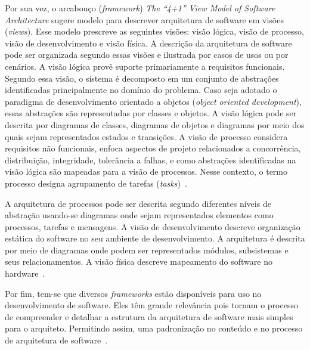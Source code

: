 Por sua vez, o arcabouço (\emph{framework}) \emph{The “4+1” View Model of Software Architecture} sugere modelo para descrever arquitetura de software em visões (\emph{views}). Esse modelo prescreve as seguintes visões: visão lógica, visão de processo, visão de desenvolvimento e visão física. A descrição da arquitetura de software pode ser organizada segundo essas visões e ilustrada por casos de usos ou por cenários. A visão lógica provê suporte primariamente a requisitos funcionais. Segundo essa visão, o sistema é decomposto em um conjunto de abstrações identificadas principalmente no domínio do problema. Caso seja adotado o paradigma de desenvolvimento orientado a objetos (\emph{object oriented development}), essas abstrações são representadas por classes e objetos. A visão lógica pode ser descrita por diagramas de classes, diagramas de objetos e diagramas por meio dos quais sejam representados estados e transições. A visão de processo considera requisitos não funcionais, enfoca aspectos de projeto relacionados a concorrência, distribuição, integridade, tolerância a falhas, e como abstrações identificadas na visão lógica são mapeadas para a visão de processos. Nesse contexto, o termo processo designa agrupamento de tarefas (\emph{tasks})~\cite{4plus1}. 

A arquitetura de processos pode ser descrita segundo diferentes níveis de abstração usando-se diagramas onde sejam representados elementos como processos, tarefas e mensagens. A visão de desenvolvimento descreve organização estática do software no seu ambiente de desenvolvimento. A arquitetura é descrita por meio de diagramas onde podem ser representados módulos, subsistemas e seus relacionamentos. A visão física descreve mapeamento do software no hardware~\cite{4plus1}.

Por fim, tem-se que diversos \emph{frameworks} estão disponíveis para uso no desenvolvimento de software. Eles têm grande relevância pois tornam o processo de compreender e detalhar a estrutura da arquitetura de software mais simples para o arquiteto. Permitindo assim, uma padronização no conteúdo e no processo de arquitetura de software~\cite{ISO_42010}.
